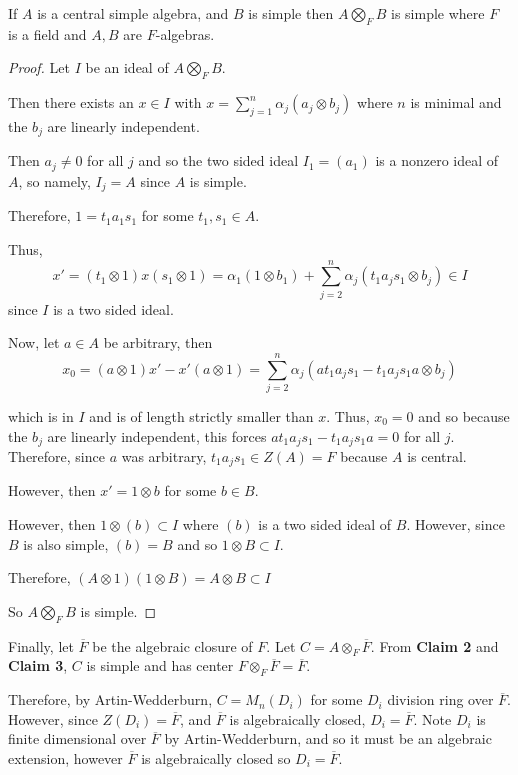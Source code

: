 \documentclass[12pt]{Qual}
\begin{document}
\begin{solution}
\begin{enumerate}[label=(\alph*)]
    \begin{claim} If $A$ is a central simple algebra, and $B$ is simple then $A\bigotimes_F B$ is simple where $F$ is a field and $A,B$ are $F$-algebras.
    \begin{proof} Let $I$ be an ideal of $A\bigotimes_F B$.

    Then there exists an $x\in I$ with $x=\sum_{j=1}^n\alpha_j(a_j\otimes b_j)$ where $n$ is minimal and the $b_j$ are linearly independent.

    Then $a_j\not=0$ for all $j$ and so the two sided ideal $I_1=(a_1)$ is a nonzero ideal of $A$, so namely, $I_j=A$ since $A$ is simple.

    Therefore, $1=t_1a_1s_1$ for some $t_1,s_1\in A$.

    Thus, $$x'=(t_1\otimes 1)x(s_1\otimes 1)=\alpha_1(1\otimes b_1)+\sum_{j=2}^n\alpha_j(t_1a_js_1\otimes b_j)\in I$$ since $I$ is a two sided ideal.

    Now, let $a\in A$ be arbitrary, then $$x_0=(a\otimes 1)x'-x'(a\otimes 1)=\sum_{j=2}^n\alpha_j(at_1a_js_1-t_1a_js_1a\otimes b_j)$$

    which is in $I$ and is of length strictly smaller than $x$. Thus, $x_0=0$ and so because the $b_j$ are linearly independent, this forces $at_1a_js_1-t_1a_js_1a=0$ for all $j.$ Therefore, since $a$ was arbitrary, $t_1a_js_1\in Z(A)=F$ because $A$ is central.

    However, then $x'=1\otimes b$ for some $b\in B$.

    However, then $1\otimes (b)\subset I$ where $(b)$ is a two sided ideal of $B.$ However, since $B$ is also simple, $(b)=B$ and so $1\otimes B\subset I$.

    Therefore, $(A\otimes 1)(1\otimes B)=A\otimes B\subset I$

    So $A\bigotimes_F B$ is simple.
    \end{proof}
    \end{claim}

    Finally, let $\overline{F}$ be the algebraic closure of $F.$ Let $C=A\otimes_F\overline{F}$. From \textbf{Claim 2} and \textbf{Claim 3}, $C$ is simple and has center $F\otimes_F\overline{F}=\overline{F}.$

    Therefore, by Artin-Wedderburn, $C= M_n(D_i)$ for some $D_i$ division ring over $\overline{F}$. However, since $Z(D_i)=\overline{F}$, and $\overline{F}$ is algebraically closed, $D_i=\overline{F}$. Note $D_i$ is finite dimensional over $\overline{F}$ by Artin-Wedderburn, and so it must be an algebraic extension, however $\overline{F}$ is algebraically closed so $D_i=\overline{F}.$


\end{enumerate}
\end{solution}
\end{document}
